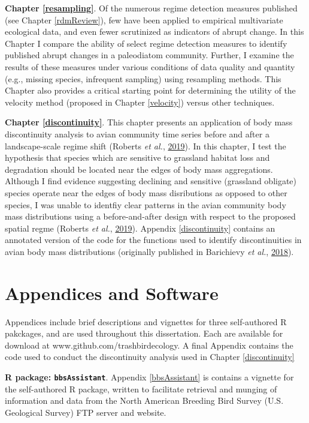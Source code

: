 \documentclass[12pt,twoside,openany]{reedthesis}
\begin{document}
\textbf{Chapter \ref{resampling}}. Of the numerous regime detection measures published (see Chapter \ref{rdmReview}), few have been applied to empirical multivariate ecological data, and even fewer scrutinized as indicators of abrupt change. In this Chapter I compare the ability of select regime detection measures to identify published abrupt changes in a paleodiatom community. Further, I examine the results of these measures under various conditions of data quality and quantity (e.g., missing species, infrequent sampling) using resampling methods. This Chapter also provides a critical starting point for determining the utility of the velocity method (proposed in Chapter \ref{velocity}) versus other techniques.

\textbf{Chapter \ref{discontinuity}}. This chapter presents an application of body mass discontinuity analysis to avian community time series before and after a landscape-scale regime shift (Roberts \emph{et al.}, \protect\hyperlink{ref-roberts2019shifting}{2019}). In this chapter, I test the hypothesis that species which are sensitive to grassland habitat loss and degradation should be located near the edges of body mass aggregations. Although I find evidence suggesting declining and sensitive (grassland obligate) species operate near the edges of body mass disributions as opposed to other species, I was unable to identfiy clear patterns in the avian community body mass distributions using a before-and-after design with respect to the proposed spatial regme (Roberts \emph{et al.}, \protect\hyperlink{ref-roberts2019shifting}{2019}). Appendix \ref{discontinuity} contains an annotated version of the code for the functions used to identify discontinuities in avian body mass distributions (originally published in Barichievy \emph{et al.}, \protect\hyperlink{ref-barichievy2018method}{2018}).

\hypertarget{appendices-and-software}{%
\section{Appendices and Software}\label{appendices-and-software}}

Appendices include brief descriptions and vignettes for three self-authored R pakckages, and are used throughout this dissertation. Each are available for download at www.github.com/trashbirdecology. A final Appendix contains the code used to conduct the discontinuity analysis used in Chapter \ref{discontinuity}

\textbf{R package: \texttt{bbsAssistant}}. Appendix \ref{bbsAssistant} is contains a vignette for the self-authored R package, written to facilitate retrieval and munging of information and data from the North American Breeding Bird Survey (U.S. Geological Survey) FTP server and website.
\end{document}
